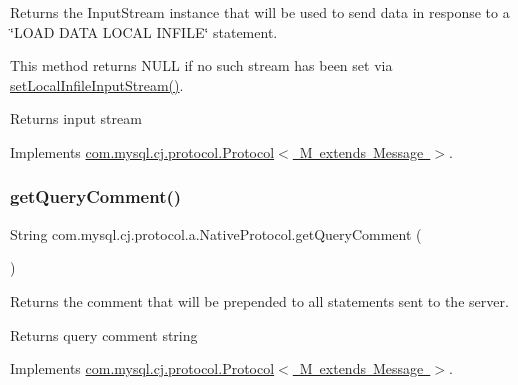 Returns the Input\+Stream instance that will be used to send data in response to a \char`\"{}\+L\+O\+A\+D D\+A\+T\+A L\+O\+C\+A\+L I\+N\+F\+I\+L\+E\char`\"{} statement.

This method returns N\+U\+LL if no such stream has been set via \mbox{\hyperlink{classcom_1_1mysql_1_1cj_1_1protocol_1_1a_1_1_native_protocol_a366f28e9d5a564e582932d16ce9d778f}{set\+Local\+Infile\+Input\+Stream()}}.

\begin{DoxyReturn}{Returns}
input stream 
\end{DoxyReturn}


Implements \mbox{\hyperlink{interfacecom_1_1mysql_1_1cj_1_1protocol_1_1_protocol_a14849c71b76edabc8dae60d7c22d9fee}{com.\+mysql.\+cj.\+protocol.\+Protocol$<$ M extends Message $>$}}.

\mbox{\label{classcom_1_1mysql_1_1cj_1_1protocol_1_1a_1_1_native_protocol_a49cbec750255abc9a23f447effd70d1d}} 
\subsubsection{\texorpdfstring{get\+Query\+Comment()}{getQueryComment()}}
{\footnotesize\ttfamily String com.\+mysql.\+cj.\+protocol.\+a.\+Native\+Protocol.\+get\+Query\+Comment (\begin{DoxyParamCaption}{ }\end{DoxyParamCaption})}

Returns the comment that will be prepended to all statements sent to the server.

\begin{DoxyReturn}{Returns}
query comment string 
\end{DoxyReturn}


Implements \mbox{\hyperlink{interfacecom_1_1mysql_1_1cj_1_1protocol_1_1_protocol_a8a25c27a012f47ca25de357e65829884}{com.\+mysql.\+cj.\+protocol.\+Protocol$<$ M extends Message $>$}}.

\mbox{\label{classcom_1_1mysql_1_1cj_1_1protocol_1_1a_1_1_native_protocol_a9ce262e6311a36690401851050b47899}} 
